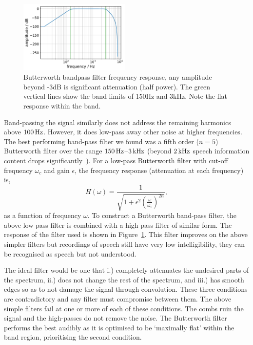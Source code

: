 \documentclass[paper-main.tex]{subfiles}
\begin{document}


\begin{figure}
	\includegraphics[width=0.49\textwidth]{figures/butterworth_150_3000-cropped.pdf}
	\caption{Butterworth bandpass filter frequency response, any amplitude beyond -3dB is significant attenuation (half power). The green vertical lines show the band limits of 150Hz and 3kHz. Note the flat response within the band.}
	\label{fig:butterworth}
\end{figure}


Band-passing the signal similarly does not address the remaining harmonics above $100\,{\rm Hz}$. 
However, it does low-pass away other noise at higher frequencies. 
The best performing band-pass filter we found was a fifth order ($n = 5$) Butterworth filter over the range $150\,{\rm Hz}$--$3\,{\rm kHz}$ (beyond $2\,{\rm kHz}$ speech information content drops significantly~\cite{speech_intelligibility}). 
For a low-pass Butterworth filter with cut-off frequency $\omega_c$ and gain $\epsilon$, the frequency response (attenuation at each frequency) is,
\begin{equation}
\label{eq:butterworth}
H(\omega) = \frac{1}{\sqrt{1+\epsilon^2 (\frac{\omega}{\omega_c})^{2n}}},
\end{equation}
as a function of frequency $\omega$. 
To construct a Butterworth band-pass filter, the above low-pass filter is combined with a high-pass filter of similar form. 
The response of the filter used is shown in Figure~\ref{fig:butterworth}. 
This filter improves on the above simpler filters but recordings of speech still have very low intelligibility, they can be recognised as speech but not understood.


The ideal filter would be one that i.) completely attenuates the undesired parts of the spectrum, ii.) does not change the rest of the spectrum, and iii.) has smooth edges so as to not damage the signal through convolution. 
These three conditions are contradictory and any filter must compromise between them. 
The above simple filters fail at one or more of each of these conditions. 
The combs ruin the signal and the high-passes do not remove the noise. 
The Butterworth filter performs the best audibly as it is optimised to be `maximally flat' within the band region, prioritising the second condition.
\end{document}
